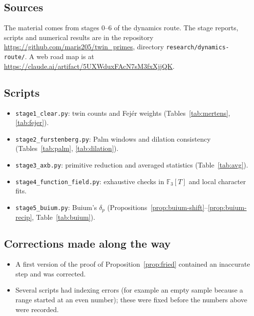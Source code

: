 \documentclass[11pt]{amsart}
\theoremstyle{definition}
\theoremstyle{remark}
\newcommand{\F}{\mathbb{F}}
\begin{document}
\subsection{Sources}
The material comes from stages 0--6 of the dynamics route. The stage reports, scripts and numerical results are in the repository \url{https://github.com/maris205/twin_primes}, directory \texttt{research/dynamics-route/}. A web road map is at \url{https://claude.ai/artifact/5UXWduxFAcN7sM3fxXjjQK}.

\subsection{Scripts}
\begin{itemize}
\item \texttt{stage1\_clear.py}: twin counts and Fejér weights (Tables~\ref{tab:mertens}, \ref{tab:fejer}).
\item \texttt{stage2\_furstenberg.py}: Palm windows and dilation consistency (Tables~\ref{tab:palm}, \ref{tab:dilation}).
\item \texttt{stage3\_axb.py}: primitive reduction and averaged statistics (Table~\ref{tab:avg}).
\item \texttt{stage4\_function\_field.py}: exhaustive checks in $\F_3[T]$ and local character fits.
\item \texttt{stage5\_buium.py}: Buium's $\delta_p$ (Propositions~\ref{prop:buium-shift}--\ref{prop:buium-recip}, Table~\ref{tab:buium}).
\end{itemize}

\subsection{Corrections made along the way}
\begin{itemize}
\item A first version of the proof of Proposition~\ref{prop:fried} contained an inaccurate step and was corrected.
\item Several scripts had indexing errors (for example an empty sample because a range started at an even number); these were fixed before the numbers above were recorded.
\end{itemize}



\end{document}
